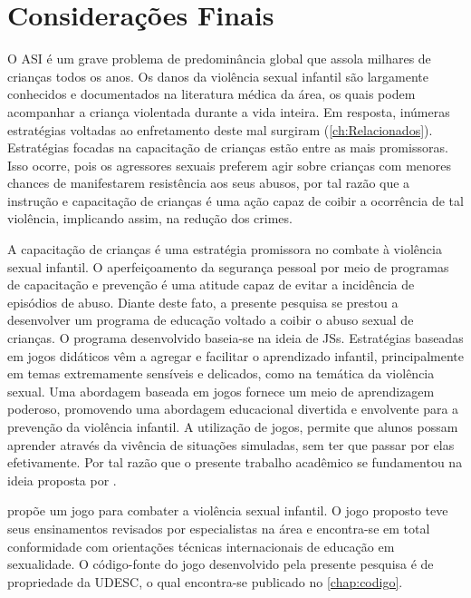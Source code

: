 \chapter{Considerações Finais}\label{ch:Conclusao}

O \acf{ASI} é um grave problema de predominância global que assola milhares de crianças todos os anos. Os danos da violência sexual infantil são largamente conhecidos e documentados na literatura médica da área, os quais podem acompanhar a criança violentada durante a vida inteira. Em resposta, inúmeras estratégias voltadas ao enfretamento deste mal surgiram (\autoref{ch:Relacionados}). Estratégias focadas na capacitação de crianças estão entre as mais promissoras. Isso ocorre, pois os agressores sexuais preferem agir sobre crianças com menores chances de manifestarem resistência aos seus abusos, por tal razão que a instrução e capacitação de crianças é uma ação capaz de coibir a ocorrência de tal violência, implicando assim, na redução dos crimes.

A capacitação de crianças é uma estratégia promissora no combate à violência sexual infantil. O aperfeiçoamento da segurança pessoal por meio de programas de capacitação e prevenção é uma atitude capaz de evitar a incidência de episódios de abuso. Diante deste fato, a presente pesquisa se prestou a desenvolver um programa de educação voltado a coibir o abuso sexual de crianças. O programa desenvolvido baseia-se na ideia de \acfp{JS}. Estratégias baseadas em jogos didáticos vêm a agregar e facilitar o aprendizado infantil, principalmente em temas extremamente sensíveis e delicados, como na temática da violência sexual. Uma abordagem baseada em jogos fornece um meio de aprendizagem poderoso, promovendo uma abordagem educacional divertida e envolvente para a prevenção da violência infantil. A utilização de jogos, permite que alunos possam aprender através da vivência de situações simuladas, sem ter que passar por elas efetivamente. Por tal razão que o presente trabalho acadêmico se fundamentou na ideia proposta por . 

 propõe um jogo para combater a violência sexual infantil. O jogo proposto teve seus ensinamentos revisados por especialistas na área e encontra-se em total conformidade com orientações técnicas internacionais de educação em sexualidade. O código-fonte do jogo desenvolvido pela presente pesquisa é de propriedade da \ac{UDESC}, o qual encontra-se publicado no \autoref{chap:codigo}. %

